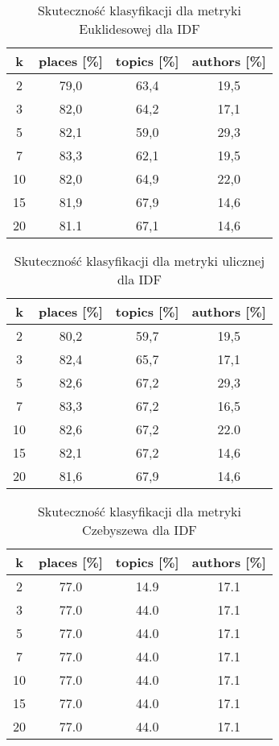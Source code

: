 \documentclass{classrep}
\begin{document}
\begin{table}[H]
	\centering
	\begin{tabular}{c c c c} 
		\hline
		\textbf{k} & \textbf{places [\%]} & \textbf{topics [\%]} &  \textbf{authors [\%]} \\ [0.5ex] 
		\hline
		\hline 
		2 & 79,0 & 63,4 & 19,5 \\ 
		3 & 82,0 & 64,2 & 17,1 \\
		5 & 82,1 & 59,0  & 29,3 \\
		7 & 83,3 & 62,1 & 19,5 \\
		10 & 82,0 & 64,9 & 22,0 \\
		15 & 81,9 & 67,9 & 14,6 \\
		20 & 81.1 & 67,1 & 14,6 \\ 
		\hline
	\end{tabular}
	\caption{Skuteczność klasyfikacji dla metryki Euklidesowej dla IDF}
\end{table}

\begin{table}[H]
	\centering
	\begin{tabular}{c c c c} 
		\hline
		\textbf{k} & \textbf{places [\%]} & \textbf{topics [\%]} &  \textbf{authors [\%]} \\ [0.5ex] 
		\hline
		\hline 
		2 & 80,2 & 59,7 & 19,5 \\ 
		3 & 82,4 & 65,7 & 17,1 \\
		5 & 82,6 & 67,2 & 29,3 \\
		7 & 83,3 & 67,2 & 16,5 \\
		10 & 82,6 & 67,2 & 22.0 \\
		15 & 82,1 & 67,2 & 14,6 \\
		20 & 81,6 & 67,9 & 14,6 \\ 
		\hline
	\end{tabular}
	\caption{Skuteczność klasyfikacji dla metryki ulicznej dla IDF}
\end{table}

\begin{table}[H]
	\centering
	\begin{tabular}{c c c c} 
		\hline
		\textbf{k} & \textbf{places [\%]} & \textbf{topics [\%]} &  \textbf{authors [\%]} \\ [0.5ex] 
		\hline
		\hline 
		2 & 77.0 & 14.9 & 17.1 \\ 
		3 & 77.0 & 44.0 & 17.1 \\
		5 & 77.0 & 44.0 & 17.1 \\
		7 & 77.0 & 44.0 & 17.1 \\
		10 & 77.0 & 44.0 & 17.1 \\
		15 & 77.0 & 44.0 & 17.1 \\
		20 & 77.0 & 44.0 & 17.1 \\ 
		\hline
	\end{tabular}
	\caption{Skuteczność klasyfikacji dla metryki Czebyszewa dla IDF}
\end{table}
\end{document}
